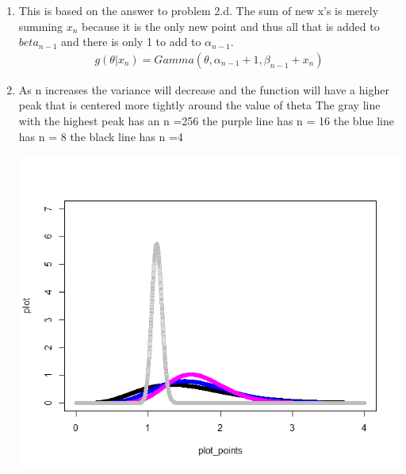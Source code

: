 \documentclass{article}
\begin{document}
\begin{enumerate}
\begin{enumerate}
			\item
				This is based on the answer to problem 2.d. The sum of new x's is merely summing $x_{n}$ because it is the only new point and thus all that is added to $beta_{n-1}$ and there is only 1 to add to $\alpha_{n-1}$. 
				\begin{gather*}
					g(\theta|x_{n}) = Gamma(\theta, \alpha_{n-1}+1, \beta_{n-1}+x_{n})
				\end{gather*}
			\item
				As n increases the variance will decrease and the function will have a higher peak that is centered more tightly around the value of theta 
				The gray line with the highest peak has an n =256 \newline
				the purple line has n = 16 \newline
				the blue line has n = 8 \newline
				the black line has n =4
				\begin{minipage}{\linewidth}
					\centering
					\includegraphics[scale=.5]{gamma}
				\end{minipage}	
			
		\end{enumerate}
	\end{enumerate}
\end{document}
